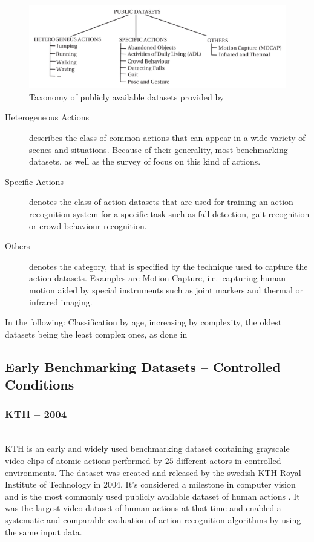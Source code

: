 \begin{figure}[H]
    \centering
    \includegraphics[width=\textwidth]{img_datasets/datasetssurvey_taxonomy}
    \caption{Taxonomy of publicly available datasets provided by \cite{chaquet_survey_2013}}
    \label{fig:datasetssurvey_taxonomy}
\end{figure}

\begin{description}
    \item[Heterogeneous Actions] describes the class of common actions that can appear in a wide variety of scenes and situations.
        Because of their generality, most benchmarking datasets, as well as the survey of \textcite{chaquet_survey_2013} focus on this kind of actions.
    \item[Specific Actions] denotes the class of action datasets that are used for training an action recognition system for a specific task such as fall detection, gait recognition or crowd behaviour recognition.
    \item[Others] denotes the category, that is specified by the technique used to capture the action datasets. Examples are Motion Capture, i.e.\ capturing human motion aided by special instruments such as joint markers and thermal or infrared imaging.
\end{description}

In the following: Classification by age, increasing by complexity, the oldest datasets being the least complex ones, as done in \cite{hassner_critical_2013}


\subsection{Early Benchmarking Datasets -- Controlled Conditions}


\subsubsection{KTH -- 2004}
\cite{schuldt_recognizing_2004}\\
KTH is an early and widely used benchmarking dataset containing grayscale video-clips of atomic actions performed by $25$ different actors in controlled environments.
The dataset was created and released by the swedish KTH Royal Institute of Technology in 2004.
It's considered a milestone in computer vision \cite{chaquet_survey_2013} and is the most commonly used publicly available dataset of human actions \cite{baccouche_sequential_2011}.
It was the largest video dataset of human actions at that time and enabled a systematic and comparable evaluation of action recognition algorithms by using the same input data.

